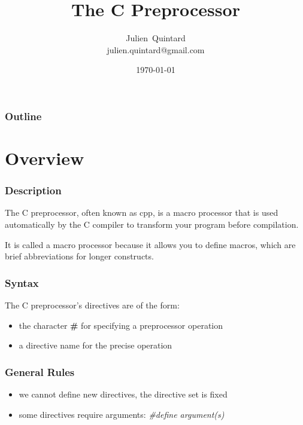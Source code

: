 \documentclass[9pt]{beamer}
\title{The C Preprocessor}
\author
{
  Julien~Quintard\inst{1} \\
  {\tiny julien.quintard@gmail.com}
}
\institute
{
  \inst{1} kaneton distributed operating system project
}
\date{\today}
\newcommand{\nl}[0]{\vspace{0.4cm}}
\begin{document}
%
%

\begin{frame}
  \titlepage
\end{frame}

%
%

\begin{frame}
  \frametitle{Outline}
  \tableofcontents
\end{frame}

%
%

\section{Overview}


\begin{frame}
  \frametitle{Description}

  The C preprocessor, often known as cpp, is a macro processor that
  is used automatically by the C compiler to transform your program
  before compilation.

  \nl

  It is called a macro processor because it allows you to define macros,
  which are brief abbreviations for longer constructs.

\end{frame}


\begin{frame}
  \frametitle{Syntax}

  The C preprocessor's directives are of the form:

  \begin{itemize}[<+->]
    \item
      the character \textbf{\#} for specifying a preprocessor operation
    \item
      a directive name for the precise operation
  \end{itemize}

\end{frame}


\begin{frame}
  \frametitle{General Rules}

  \begin{itemize}[<+->]
    \item
      we \alert{cannot} define new directives, the directive set is fixed
    \item
      some directives require arguments: \textit{\#define argument(s)}
  \end{itemize}

\end{frame}
\end{document}
